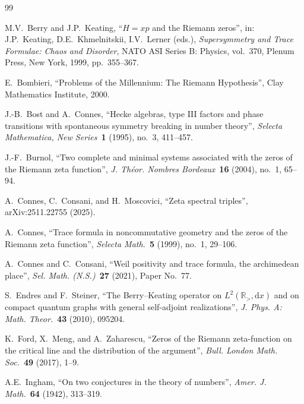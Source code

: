 \documentclass[11pt]{article}
\begin{document}
\newpage
\begin{thebibliography}{99}

M.V.~Berry and J.P.~Keating,
``$H=xp$ and the Riemann zeros'',
in: J.P.~Keating, D.E.~Khmelnitskii, I.V.~Lerner (eds.),
\textit{Supersymmetry and Trace Formulae: Chaos and Disorder},
NATO ASI Series B: Physics, vol.~370,
Plenum Press, New York, 1999, pp.~355--367.

E.~Bombieri,
``Problems of the Millennium: The Riemann Hypothesis'',
Clay Mathematics Institute, 2000.

J.-B.~Bost and A.~Connes,
``Hecke algebras, type III factors and phase transitions
with spontaneous symmetry breaking in number theory'',
\emph{Selecta Mathematica, New Series}\ \textbf{1} (1995), no.~3, 411--457.

J.-F.~Burnol,
``Two complete and minimal systems associated with
the zeros of the Riemann zeta function'',
\emph{J. Th\'eor. Nombres Bordeaux}\ \textbf{16} (2004), no.~1, 65--94.

A.~Connes, C.~Consani, and H.~Moscovici,
``Zeta spectral triples'',
arXiv:2511.22755 (2025).

A.~Connes,
``Trace formula in noncommutative geometry and the zeros
of the Riemann zeta function'',
\emph{Selecta Math.}\ \textbf{5} (1999), no.~1, 29--106.

A.~Connes and C.~Consani,
``Weil positivity and trace formula, the archimedean place'',
\emph{Sel. Math. (N.S.)}\ \textbf{27} (2021), Paper No.~77.

S.~Endres and F.~Steiner,
``The Berry--Keating operator on $L^2(\mathbb{R}_{>},\mathrm{d}x)$
and on compact quantum graphs with general self-adjoint realizations'',
\emph{J. Phys. A: Math. Theor.}\ \textbf{43} (2010), 095204.

K.~Ford, X.~Meng, and A.~Zaharescu,
``Zeros of the Riemann zeta-function on the critical line
and the distribution of the argument'',
\emph{Bull. London Math. Soc.}\ \textbf{49} (2017), 1--9.

A.E.~Ingham,
``On two conjectures in the theory of numbers'',
\emph{Amer. J. Math.}\ \textbf{64} (1942), 313--319.


\end{thebibliography}
\end{document}
